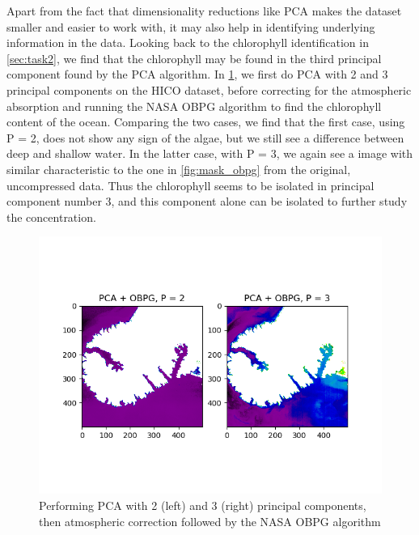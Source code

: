 Apart from the fact that dimensionality reductions like PCA makes the dataset 
smaller and easier to work with, it may also help in identifying underlying 
information in the data. Looking back to the chlorophyll identification in 
\cref{sec:task2}, we find that the chlorophyll may be found in the third 
principal component found by the PCA algorithm. In \cref{fig:pca_obpg}, we 
first do PCA with 2 and 3 principal components on the HICO dataset, before 
correcting for the atmospheric absorption and running the NASA OBPG algorithm 
to find the chlorophyll content of the ocean. Comparing the two cases, we 
find that the first case, using P = 2, does not show any sign of the algae, 
but we still see a difference between deep and shallow water. In the latter 
case, with P = 3, we again see a image with similar characteristic to the one 
in \cref{fig:mask_obpg} from the original, uncompressed data. Thus the 
chlorophyll seems to be isolated in principal component number 3, and this 
component alone can be isolated to further study the concentration. 

\begin{figure}
    \centering
    \includegraphics[width=\textwidth]{../fig/PCA_OBPG_2_3.png}
    \caption{Performing PCA with 2 (left) and 3 (right) principal components, 
    then atmospheric correction followed by the NASA OBPG algorithm}
    \label{fig:pca_obpg}
\end{figure}